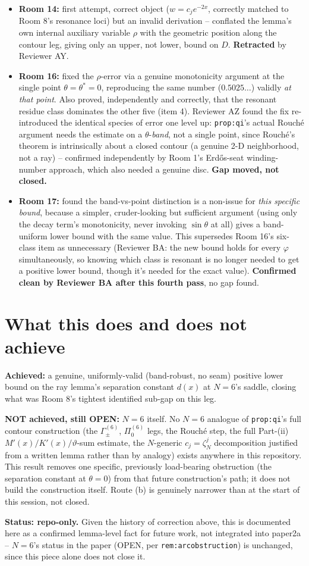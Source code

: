 \documentclass[11pt]{article}
\begin{document}
\begin{itemize}
\item \textbf{Room 14:} first attempt, correct object ($w=c_je^{-2x}$, correctly matched to
Room 8's resonance loci) but an invalid derivation -- conflated the lemma's own internal auxiliary
variable $\rho$ with the geometric position along the contour leg, giving only an upper, not
lower, bound on $D$. \textbf{Retracted} by Reviewer AY.
\item \textbf{Room 16:} fixed the $\rho$-error via a genuine monotonicity argument at the single
point $\theta=\theta^\ast=0$, reproducing the same number ($0.5025\ldots$) validly \emph{at that
point}. Also proved, independently and correctly, that the resonant residue class dominates the
other five (item 4). Reviewer AZ found the fix re-introduced the identical species of error one
level up: \texttt{prop:qi}'s actual Rouch\'e argument needs the estimate on a $\theta$-\emph{band},
not a single point, since Rouch\'e's theorem is intrinsically about a closed contour (a genuine 2-D
neighborhood, not a ray) -- confirmed independently by Room 1's Erdős-seat winding-number approach,
which also needed a genuine disc. \textbf{Gap moved, not closed.}
\item \textbf{Room 17:} found the band-vs-point distinction is a non-issue for \emph{this specific
bound}, because a simpler, cruder-looking but sufficient argument (using only the decay term's
monotonicity, never invoking $\sin\theta$ at all) gives a band-uniform lower bound with the same
value. This supersedes Room 16's six-class item as unnecessary (Reviewer BA: the new bound holds
for every $\varphi$ simultaneously, so knowing which class is resonant is no longer needed to get a
positive lower bound, though it's needed for the exact value). \textbf{Confirmed clean by Reviewer
BA after this fourth pass}, no gap found.
\end{itemize}

\section*{What this does and does not achieve}

\textbf{Achieved:} a genuine, uniformly-valid (band-robust, no seam) positive lower bound on the
ray lemma's separation constant $d(x)$ at $N=6$'s saddle, closing what was Room 8's tightest
identified sub-gap on this leg.

\textbf{NOT achieved, still OPEN:} $N=6$ itself. No $N=6$ analogue of \texttt{prop:qi}'s full
contour construction (the $\Gamma_\pm^{(6)}$, $\Pi_0^{(6)}$ legs, the Rouch\'e step, the full
Part-(ii) $M'(x)/K'(x)/\vartheta$-sum estimate, the $N$-generic $c_j=\zeta_N^j$ decomposition
justified from a written lemma rather than by analogy) exists anywhere in this repository. This
result removes one specific, previously load-bearing obstruction (the separation constant at
$\theta=0$) from that future construction's path; it does not build the construction itself. Route
(b) is genuinely narrower than at the start of this session, not closed.

\textbf{Status: repo-only.} Given the history of correction above, this is documented here as a
confirmed lemma-level fact for future work, not integrated into paper2a -- $N=6$'s status in the
paper (OPEN, per \texttt{rem:arcobstruction}) is unchanged, since this piece alone does not close
it.
\end{document}
